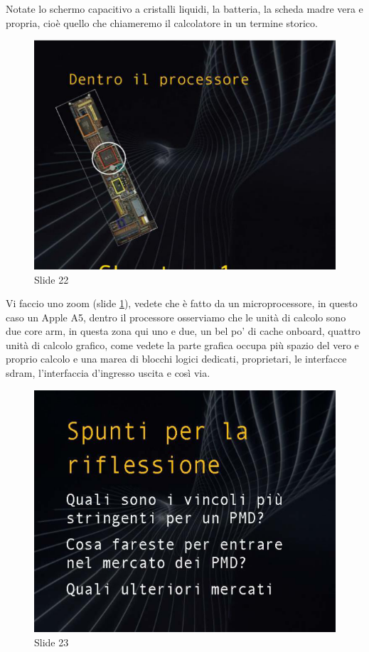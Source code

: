 Notate lo schermo capacitivo a cristalli liquidi, la batteria, la scheda madre vera e propria, cioè quello che chiameremo il calcolatore in un termine storico.

\begin{figure}[ht]
    \centering
    \includegraphics[width=0.8\linewidth]{images/Lez01_p04_fig_05.png}
    \caption{Slide 22}
    \label{fig:slide_22}
\end{figure}


Vi faccio uno zoom (slide \ref{fig:slide_22}), vedete che è fatto da un microprocessore, in questo caso un Apple A5, dentro il processore osserviamo che le unità di calcolo sono due core arm, in questa zona qui uno e due, un bel po' di cache onboard, quattro unità di calcolo grafico, come vedete la parte grafica occupa più spazio del vero e proprio calcolo e una marea di blocchi logici dedicati, proprietari, le interfacce sdram, l'interfaccia d'ingresso uscita e così via.

\begin{figure}[ht]
    \centering
    \includegraphics[width=0.8\linewidth]{images/Lez01_p04_fig_06.png}
    \caption{Slide 23}
    \label{fig:slide_23}
\end{figure}

